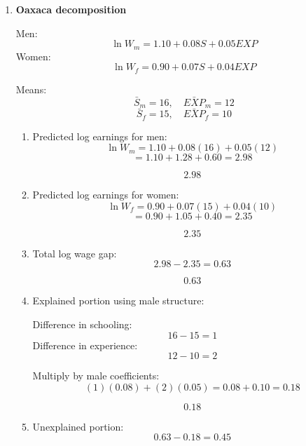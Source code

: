 \documentclass[12pt]{article}
\begin{document}
\begin{enumerate}
\begin{enumerate}[label=(\alph*)]
    \item Why it matters for wages:

    During general training, trainees may accept lower wages because they will gain future transferable benefits. Under specific training, firms often share more of the cost because the future gains are not fully portable.
\end{enumerate}

\section*{Part VII: Discrimination and Oaxaca Decomposition}

\item \textbf{Oaxaca decomposition}

Men:
\[
\ln W_m=1.10+0.08S+0.05EXP
\]
Women:
\[
\ln W_f=0.90+0.07S+0.04EXP
\]

Means:
\[
\bar S_m=16,\quad \bar{EXP}_m=12
\]
\[
\bar S_f=15,\quad \bar{EXP}_f=10
\]

\begin{enumerate}[label=(\alph*)]
    \item Predicted log earnings for men:
    \[
    \ln W_m=1.10+0.08(16)+0.05(12)
    \]
    \[
    =1.10+1.28+0.60=2.98
    \]

    \[
    \boxed{2.98}
    \]

    \item Predicted log earnings for women:
    \[
    \ln W_f=0.90+0.07(15)+0.04(10)
    \]
    \[
    =0.90+1.05+0.40=2.35
    \]

    \[
    \boxed{2.35}
    \]

    \item Total log wage gap:
    \[
    2.98-2.35=0.63
    \]

    \[
    \boxed{0.63}
    \]

    \item Explained portion using male structure:

    Difference in schooling:
    \[
    16-15=1
    \]
    Difference in experience:
    \[
    12-10=2
    \]

    Multiply by male coefficients:
    \[
    (1)(0.08)+(2)(0.05)=0.08+0.10=0.18
    \]

    \[
    \boxed{0.18}
    \]

    \item Unexplained portion:
    \[
    0.63-0.18=0.45
    \]


\end{enumerate}
\end{enumerate}
\end{document}
